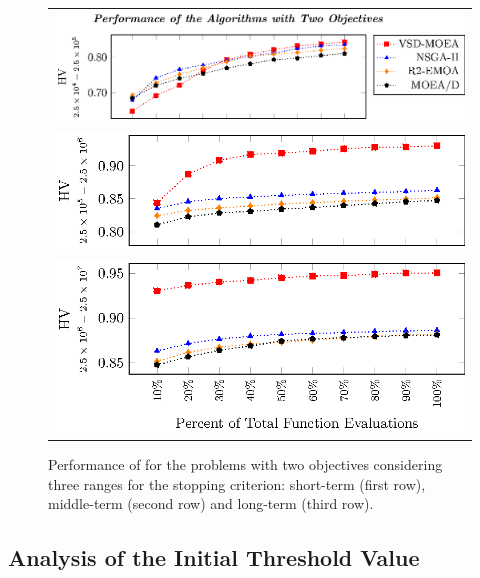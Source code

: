 \begin{figure}[t]
\centering
\begin{tabular}{l}
 \includegraphics[scale=0.6]{Images/Time_tikz-figure0.eps}\\[0cm]%
 \includegraphics[scale=0.6]{Images/Time_tikz-figure1.eps}\\[0cm]%
 \includegraphics[scale=0.6]{Images/Time_tikz-figure2.eps}
\end{tabular}
\caption{Performance of \MOEAS{} for the problems with two objectives considering three ranges for the stopping criterion: 
short-term (first row), middle-term (second row) and long-term (third row).}\label{fig:Performance_time_2obj}
\end{figure}

\subsection{Analysis of the Initial Threshold Value}

